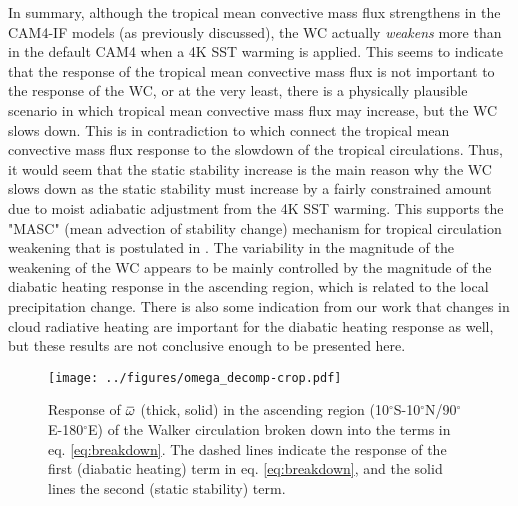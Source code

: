 \documentclass[letterpaper,12pt,titlepage,oneside,final]{book}
\newcommand{\overbar}[1]{\mkern 1.5mu\overline{\mkern-1.5mu#1\mkern-1.5mu}\mkern 1.5mu}
\begin{document}
In summary, although the tropical mean convective mass flux strengthens in the CAM4-IF models (as previously discussed), the WC actually \textit{weakens} more than in the default CAM4 when a 4K SST warming is applied. This seems to indicate that the response of the tropical mean convective mass flux is not important to the response of the WC, or at the very least, there is a physically plausible scenario in which tropical mean convective mass flux may increase, but the WC slows down. This is in contradiction to \citep{held_robust_2006,vecchi_global_2007} which connect the tropical mean convective mass flux response to the slowdown of the tropical circulations. Thus, it would seem that the static stability increase is the main reason why the WC slows down as the static stability must increase by a fairly constrained amount due to moist adiabatic adjustment from the 4K SST warming. This supports the "MASC" (mean advection of stability change) mechanism for tropical circulation weakening that is postulated in \citep{ma_mechanisms_2011}. The variability in the magnitude of the weakening of the WC appears to be mainly controlled by the magnitude of the diabatic heating response in the ascending region, which is related to the local precipitation change. There is also some indication from our work that changes in cloud radiative heating are important for the diabatic heating response as well, but these results are not conclusive enough to be presented here.

\begin{figure}[H]
\centering
\noindent\texttt{[image: ../figures/omega\_decomp-crop.pdf]}\hfill
\caption{Response of $\overbar{\omega}$ (thick, solid) in the ascending region (10$^{\circ}$S-10$^{\circ}$N/90$^{\circ}$E-180$^{\circ}$E) of the Walker circulation broken down into the terms in eq. \ref{eq:breakdown}. The dashed lines indicate the response of the first (diabatic heating) term in eq. \ref{eq:breakdown}, and the solid lines the second (static stability) term. }
\label{fig:omegdecomp}
\end{figure}
\end{document}
